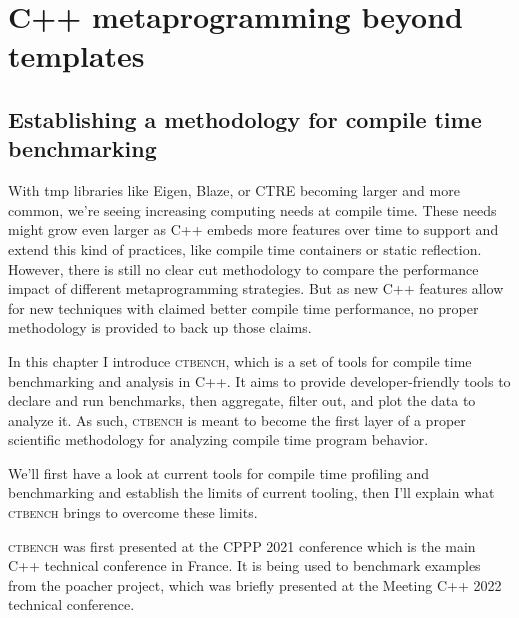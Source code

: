 \documentclass[english,12pt,a4paper]{book}
\providecommand{\cpp}{\textsc{C++}\xspace}
\providecommand{\ctbench}{\textsc{ctbench}\xspace}
\begin{document}


\part{C++ metaprogramming beyond templates}

\chapter{
  Establishing a methodology for compile time benchmarking
}

With \gls{tmp} libraries like Eigen\cite{eigen}, Blaze\cite{blazelib},
or CTRE\cite{ctre} becoming larger and more common,
we're seeing increasing computing needs at compile time. These needs might grow
even larger as \cpp embeds more features over time to support and extend this
kind of practices, like compile time containers\cite{more-constexpr-containers}
or static reflection\cite{static-reflection}. However, there is still no clear
cut methodology to compare the performance impact of different metaprogramming
strategies. But as new \cpp features allow for new techniques with claimed
better compile time performance, no proper methodology is provided to back up
those claims.

In this chapter I introduce \ctbench, which is a set of tools for compile time
benchmarking and analysis in \cpp. It aims to provide developer-friendly tools
to declare and run benchmarks, then aggregate, filter out, and plot the data to
analyze it. As such, \ctbench is meant to become the first layer of a proper
scientific methodology for analyzing compile time program behavior.

We'll first have a look at current tools for compile time profiling and
benchmarking and establish the limits of current tooling, then I'll explain
what \ctbench brings to overcome these limits.

\ctbench was first presented at the CPPP 2021 conference\cite{ctbench-cppp21}
which is the main \cpp technical conference in France. It is being used to
benchmark examples from the poacher\cite{poacher} project, which was briefly
presented at the Meeting \cpp 2022\cite{meetingcpp22} technical conference.


% 


\end{document}
